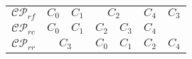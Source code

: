 \begin{tabular}{c|c|c|c|c|}
	\cline{2-5}
	$\mathcal{C}\mathcal{P}_{rf}$ & $C_{0} \quad C_{1}$ & $C_{2}$ & $C_{4}$ & $C_{3}$ \\
	\cline{2-5}
	$\mathcal{C}\mathcal{P}_{rc}$ & $C_{0} \quad C_{1}$ & $C_{2} \quad C_{3}$ & $C_{4}$ & \\
	\cline{2-5}
	$\mathcal{C}\mathcal{P}_{rr}$ & $C_{3}$ & $C_{0} \quad C_{1}$ & $C_{2}$ & $C_{4}$ \\
	\cline{2-5}
\end{tabular}

